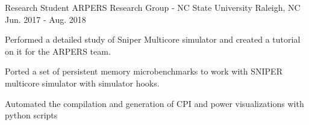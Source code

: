 \par\addvspace{1ex}


\begin{cventries}

  \cventry
    {Research Student} %
    {ARPERS Research Group - NC State University} %
    {Raleigh, NC} %
    {\color{darkgray}Jun. 2017 - Aug. 2018} %
    {
      \begin{cvitems} %
        \item {Performed a detailed study of Sniper Multicore simulator and created a tutorial on it for the ARPERS team. }
        \item {Ported a set of persistent memory microbenchmarks to work with SNIPER multicore simulator with simulator hooks.}
        \item {Automated the compilation and generation of CPI and power visualizations with python scripts}
      \end{cvitems}
    }



\end{cventries}

